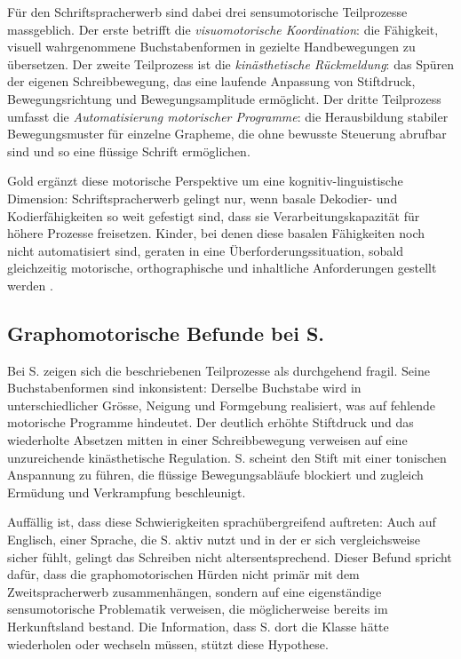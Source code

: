 \documentclass[ngerman, a4paper]{article}
\begin{document}
Für den Schriftspracherwerb sind dabei drei sensumotorische Teilprozesse massgeblich.
Der erste betrifft die \textit{visuomotorische Koordination}: die Fähigkeit, visuell
wahrgenommene Buchstabenformen in gezielte Handbewegungen zu übersetzen. Der zweite
Teilprozess ist die \textit{kinästhetische Rückmeldung}: das Spüren der eigenen
Schreibbewegung, das eine laufende Anpassung von Stiftdruck, Bewegungsrichtung und
Bewegungsamplitude ermöglicht. Der dritte Teilprozess umfasst die
\textit{Automatisierung motorischer Programme}: die Herausbildung stabiler
Bewegungsmuster für einzelne Grapheme, die ohne bewusste Steuerung abrufbar sind und
so eine flüssige Schrift ermöglichen.

Gold ergänzt diese motorische Perspektive um eine kognitiv-linguistische Dimension:
Schriftspracherwerb gelingt nur, wenn basale Dekodier- und Kodierfähigkeiten so weit
gefestigt sind, dass sie Verarbeitungskapazität für höhere Prozesse freisetzen. Kinder,
bei denen diese basalen Fähigkeiten noch nicht automatisiert sind, geraten in eine
Überforderungssituation, sobald gleichzeitig motorische, orthographische und inhaltliche
Anforderungen gestellt werden \parencite{gold2018lesenkannmanlernen}.

\subsection{Graphomotorische Befunde bei S.}

Bei S. zeigen sich die beschriebenen Teilprozesse als durchgehend fragil. Seine
Buchstabenformen sind inkonsistent: Derselbe Buchstabe wird in unterschiedlicher Grösse,
Neigung und Formgebung realisiert, was auf fehlende motorische Programme hindeutet. Der
deutlich erhöhte Stiftdruck und das wiederholte Absetzen mitten in einer Schreibbewegung
verweisen auf eine unzureichende kinästhetische Regulation. S. scheint den Stift mit einer
tonischen Anspannung zu führen, die flüssige Bewegungsabläufe blockiert und zugleich
Ermüdung und Verkrampfung beschleunigt.

Auffällig ist, dass diese Schwierigkeiten sprachübergreifend auftreten: Auch auf Englisch,
einer Sprache, die S. aktiv nutzt und in der er sich vergleichsweise sicher fühlt,
gelingt das Schreiben nicht altersentsprechend. Dieser Befund spricht dafür, dass die
graphomotorischen Hürden nicht primär mit dem Zweitspracherwerb zusammenhängen,
sondern auf eine eigenständige sensumotorische Problematik verweisen, die möglicherweise
bereits im Herkunftsland bestand. Die Information, dass S. dort die Klasse hätte
wiederholen oder wechseln müssen, stützt diese Hypothese.
\end{document}
